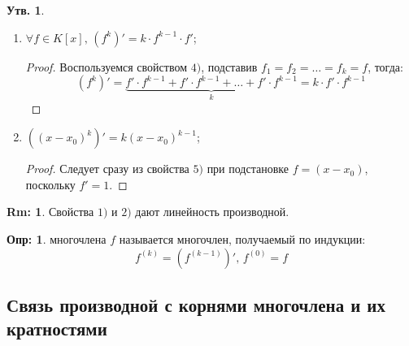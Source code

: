 \documentclass[12pt]{article}
\theoremstyle{definition}
\newtheorem{defn}{Опр:}
\newtheorem{rem}{Rm:}
\newtheorem{prop}{Утв.}
\begin{document}
\begin{prop}
\begin{enumerate}[label=\arabic*)]
\begin{proof}
			\uline{Шаг индукции}: Пусть утверждение верно для $k$, покажем верность для $k+1$:
			$$
				(f_1{\cdot}f_2{\cdot}\dotsc{\cdot}f_k{\cdot}f_{k+1})' = (f_1{\cdot}f_2{\cdot}\dotsc{\cdot}f_k)'{\cdot}f_{k+1} + f_1{\cdot}f_2{\cdot}\dotsc{\cdot}f_k{\cdot}f'_{k+1} = 
			$$
			$$
				= \left(f'_1{\cdot}f_2{\cdot}\dotsc{\cdot}f_k + f_1{\cdot}f'_2{\cdot}\dotsc{\cdot}f_k + \dotsc + f_1{\cdot}f_2{\cdot}\dotsc{\cdot}f'_k \right){\cdot}f_{k+1} + f_1{\cdot}f_2{\cdot}\dotsc{\cdot}f_k{\cdot}f'_{k+1} = 
			$$
			$$
				= f'_1{\cdot}f_2{\cdot}\dotsc{\cdot}f_k{\cdot}f_{k+1} + f_1{\cdot}f'_2{\cdot}\dotsc{\cdot}f_k{\cdot}f_{k+1} + \dotsc + f_1{\cdot}f_2{\cdot}\dotsc{\cdot}f'_k{\cdot}f_{k+1} + f_1{\cdot}f_2{\cdot}\dotsc{\cdot}f_k{\cdot}f'_{k+1}
			$$
		\end{proof}
		\item $\forall f \in K[x], \, (f^k)' = k{\cdot}f^{k-1}{\cdot}f'$;
		\begin{proof}
			Воспользуемся свойством $4)$, подставив $f_1 = f_2 = \dotsc = f_k = f$, тогда:
			$$
				(f^k)' = \underbrace{f'{\cdot}f^{k-1} + f'{\cdot}f^{k-1} + \dotsc+ f'{\cdot}f^{k-1}}_{k} = k{\cdot}f'{\cdot}f^{k-1}
			$$
		\end{proof}
		\item $\left((x - x_0)^k\right)' = k(x - x_0)^{k-1}$;
		\begin{proof}
			Следует сразу из свойства $5)$ при подстановке $f = (x - x_0)$, поскольку $f' = 1$.
		\end{proof}
 	\end{enumerate}
\end{prop}
\begin{rem}
	Свойства $1)$ и $2)$ дают линейность производной.
\end{rem}
\begin{defn}
	 многочлена $f$ называется многочлен, получаемый по индукции:
	$$
		f^{(k)} = \left(f^{(k-1)}\right)', \, f^{(0)} = f
	$$
\end{defn}

\subsection*{Связь производной с корнями многочлена и их кратностями}
\end{document}

